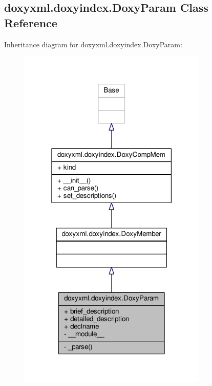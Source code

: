 \subsection{doxyxml.\+doxyindex.\+Doxy\+Param Class Reference}
\label{classdoxyxml_1_1doxyindex_1_1DoxyParam}


Inheritance diagram for doxyxml.\+doxyindex.\+Doxy\+Param\+:
\nopagebreak
\begin{figure}[H]
\begin{center}
\leavevmode
\includegraphics[width=255pt]{d5/d7d/classdoxyxml_1_1doxyindex_1_1DoxyParam__inherit__graph}
\end{center}
\end{figure}


